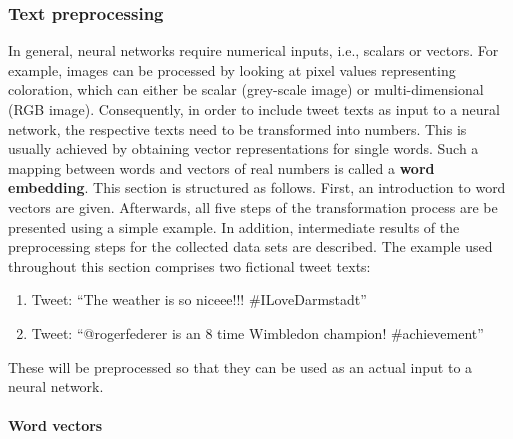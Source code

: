 \subsubsection{Text preprocessing}
\label{sub:text_preprocessing}

In general, neural networks require numerical inputs, i.e., scalars or vectors.
For example, images can be processed by looking at pixel values representing
coloration, which can either be scalar (grey-scale image) or multi-dimensional
(RGB image).
Consequently, in order to include tweet texts as input to a neural network,
the respective texts need to be transformed into numbers.
This is usually achieved by obtaining vector representations for single words.
Such a mapping between words and vectors of real numbers is called a \textbf{word
embedding}.
This section is structured as follows.
First, an introduction to word vectors are given.
Afterwards, all five steps of the transformation process are be presented using a simple example.
In addition, intermediate results of the preprocessing steps for the collected
data sets are described.
The example used throughout this section comprises two fictional tweet texts:

\begin{enumerate}
  \item Tweet: ``The weather is so niceee!!! \#ILoveDarmstadt''
  \item Tweet: ``@rogerfederer is an 8 time Wimbledon champion! \#achievement''
\end{enumerate}

These will be preprocessed so that they can be used as an actual input to a neural network.

\paragraph{Word vectors}
\label{sub:word_vectors}

